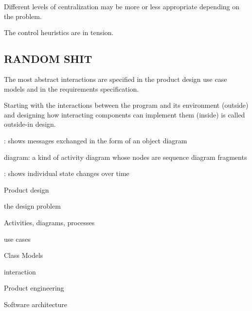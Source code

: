 \begin{compactitem}
\begin{compactitem}
\begin{compactitem}
\item  Different levels of centralization may be more or less appropriate depending on the problem.

\item The control heuristics are in tension.



\end{compactitem}
\subsection{RANDOM SHIT}


The most abstract interactions are specified in the product design use case models and in the requirements specification.

Starting with the interactions between the program and its environment (outside) and designing how interacting components can implement them (inside) is called outside-in design.








\item {}: shows messages exchanged in the  form of an object diagram
\item {} diagram: a kind of activity diagram whose nodes are sequence diagram fragments
\item {}: shows individual state changes over time
\end{compactitem}
\item 
\end{compactitem}




\begin{compactitem}
\item Product design 
\begin{compactitem}
\item the design problem
\item Activities, diagrams, processes
\item use cases
\end{compactitem}
\item Class Models
\begin{compactitem}
\item interaction
\end{compactitem}
\item Product engineering
\begin{compactitem}
\item Software architecture
\end{compactitem}
\end{compactitem}


